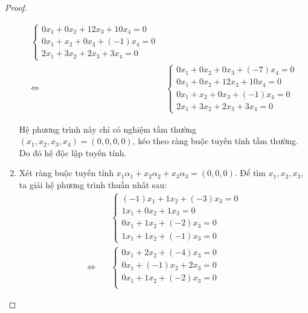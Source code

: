 \documentclass[class=linear-algebra,crop=false]{standalone}
\begin{document}
\begin{proof}
\begin{enumerate}[label = (\alph*)]
\begin{align*}
\begin{cases}
                      0x_{1} + 0x_{2} + 12x_{3} + 10x_{4} = 0 \\
                      0x_{1} + x_{2} + 0x_{3} + (-1)x_{4} = 0 \\
                      2x_{1} + 3x_{2} + 2x_{3} + 3x_{4} = 0
                  \end{cases}                            \\
                  \Leftrightarrow\quad &
                  \begin{cases}
                      0x_{1} + 0x_{2} + 0x_{3} + (-7)x_{4} = 0 \\
                      0x_{1} + 0x_{2} + 12x_{3} + 10x_{4} = 0  \\
                      0x_{1} + x_{2} + 0x_{3} + (-1)x_{4} = 0  \\
                      2x_{1} + 3x_{2} + 2x_{3} + 3x_{4} = 0
                  \end{cases}
              \end{align*}
              \par Hệ phương trình này chỉ có nghiệm tầm thường $(x_{1}, x_{2}, x_{3}, x_{4}) = (0, 0, 0, 0)$, kéo theo ràng buộc tuyến tính tầm thường. Do đó hệ độc lập tuyến tính.
        \item Xét ràng buộc tuyến tính $x_{1}\alpha_{1} + x_{2}\alpha_{2} + x_{3}\alpha_{3} = (0, 0, 0)$. Để tìm $x_{1}, x_{2}, x_{3}$, ta giải hệ phương trình thuần nhất sau:
              \begin{align*}
                                       & \begin{cases}
                                             (-1)x_{1} + 1x_{2} + (-3)x_{3} = 0 \\
                                             1x_{1} + 0x_{2} + 1x_{3} = 0       \\
                                             0x_{1} + 1x_{2} + (-2)x_{3} = 0    \\
                                             1x_{1} + 1x_{2} + (-1)x_{3} = 0
                                         \end{cases} \\
                  \Leftrightarrow\quad &
                  \begin{cases}
                      0x_{1} + 2x_{2} + (-4)x_{3} = 0 \\
                      0x_{1} + (-1)x_{2} + 2x_{3} = 0 \\
                      0x_{1} + 1x_{2} + (-2)x_{3} = 0 \\

\end{cases}
\end{align*}
\end{enumerate}
\end{proof}
\end{document}
